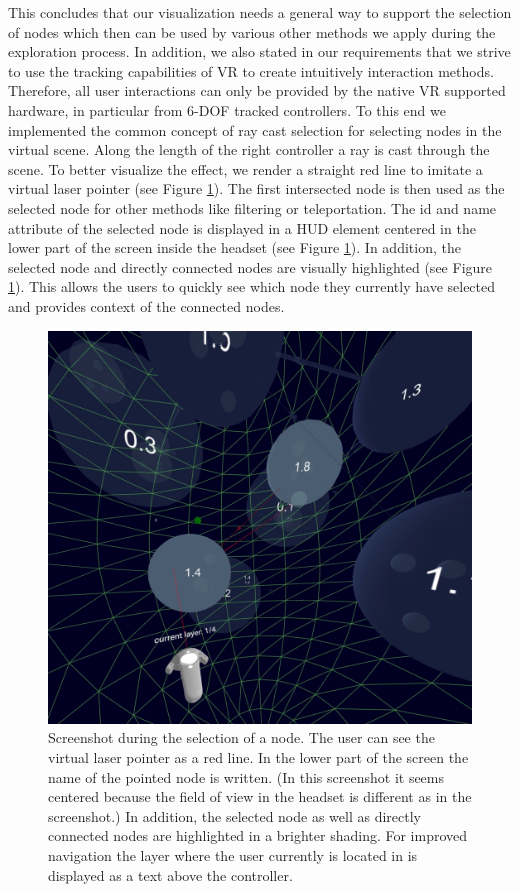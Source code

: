 This concludes that our visualization needs a general way to support the selection of nodes which then can be used by various other methods we apply during the exploration process. 
In addition, we also stated in our requirements that we strive to use the tracking capabilities of VR to create intuitively interaction methods.
Therefore, all user interactions can only be provided by the native VR supported hardware, in particular from 6-DOF tracked controllers. 
To this end we implemented the common concept of ray cast selection for selecting nodes in the virtual scene. Along the length of the right controller a ray is cast through the scene. To better visualize the effect, we render a straight red line to imitate a virtual laser pointer (see Figure \ref{fig:screenshot_interaction}). The first intersected node is then used as the selected node for other methods like filtering or teleportation. The id and name attribute of the selected node is displayed in a HUD element centered in the lower part of the screen inside the headset (see Figure \ref{fig:screenshot_interaction}). In addition, the selected node and directly connected nodes are visually highlighted (see Figure \ref{fig:screenshot_interaction}). This allows the users to quickly see which node they currently have selected and provides context of the connected nodes.

\begin{figure}[h]
    \centering
    \includegraphics[width=1\textwidth]{graphics/screenShotFilteringNodes2.jpg}
    \caption[Screenshot during the selection of a node.]{Screenshot during the selection of a node. The user can see the virtual laser pointer as a red line. 
    In the lower part of the screen the name of the pointed node is written. (In this screenshot it seems centered because the field of view in the headset is different as in the screenshot.)    
    In addition, the selected node as well as directly connected nodes are highlighted in a brighter shading. For improved navigation the layer where the user currently is located in is displayed as a text above the controller.} 
    \label{fig:screenshot_interaction} 
\end{figure}


